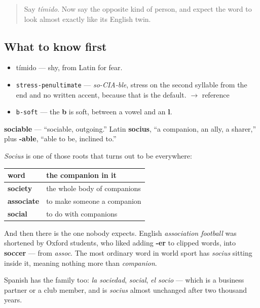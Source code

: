 \begin{quote}
Say \emph{tímido}. Now say the opposite kind of person, and expect the word to look almost exactly like its English twin.
\end{quote}

\subsection*{What to know first}
\begin{itemize}
\raggedright
  \item tímido — shy, from Latin for fear.
\end{itemize}

\begin{sounds}
\begin{itemize}
\raggedright
  \item \texttt{stress-penultimate} — \emph{so-CIA-ble}, stress on the second syllable from the end and no written accent, because that is the default. $\to$ reference
  \item \texttt{b-soft} — the \textbf{b} is soft, between a vowel and an \textbf{l}.
\end{itemize}
\end{sounds}

\begin{cousinweb}
\textbf{sociable} — \textquotedblleft{}sociable, outgoing.\textquotedblright{} Latin \textbf{socius}, \textquotedblleft{}a companion, an ally, a sharer,\textquotedblright{} plus \textbf{-able}, \textquotedblleft{}able to be, inclined to.\textquotedblright{}

\emph{Socius} is one of those roots that turns out to be everywhere:

\noindent
\begin{tabularx}{\linewidth}{@{}>{\raggedright\arraybackslash}X>{\raggedright\arraybackslash}X@{}}
\toprule
\textbf{word} & \textbf{the companion in it} \\
\midrule
\textbf{society} & the whole body of companions \\
\textbf{associate} & to make someone a companion \\
\textbf{social} & to do with companions \\
\bottomrule
\end{tabularx}

And then there is the one nobody expects. English \emph{association football} was shortened by Oxford students, who liked adding \textbf{-er} to clipped words, into \textbf{soccer} — from \emph{assoc}. The most ordinary word in world sport has \emph{socius} sitting inside it, meaning nothing more than \emph{companion}.

Spanish has the family too: \emph{la sociedad}, \emph{social}, \emph{el socio} — which is a business partner or a club member, and is \emph{socius} almost unchanged after two thousand years.
\end{cousinweb}

